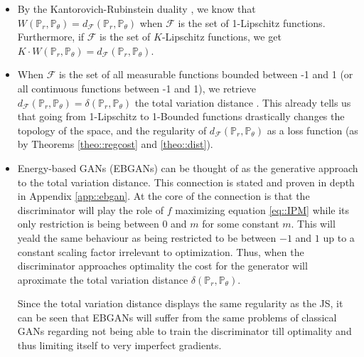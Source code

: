 \documentclass{article} %
\newcommand\PP{\mathbb{P}}
\theoremstyle{definition}
\theoremstyle{definition}
\newcommand\manF{\mathcal{F}}
\begin{document}
\begin{itemize}
\item By the Kantorovich-Rubinstein duality \cite{Vil},
we know that $W(\PP_r, \PP_\theta) = d_\manF(\PP_r,
\PP_\theta)$ when $\manF$ is the set of 1-Lipschitz
functions. Furthermore, if $\manF$ is the set
of $K$-Lipschitz functions, we get $K \cdot W(\PP_r,
\PP_\theta) = d_\manF(\PP_r, \PP_\theta)$.

\item When $\manF$ is the set of all measurable
functions bounded between -1 and 1 (or all
continuous functions between -1 and 1), we
retrieve $d_\manF(\PP_r, \PP_\theta) = \delta(\PP_r,
\PP_\theta)$ the total variation distance \cite{Muller-IPM}.
This already tells us that going from 1-Lipschitz
to 1-Bounded functions drastically changes the
topology of the space, and the regularity
of $d_\manF(\PP_r, \PP_\theta)$ as a loss
function (as by Theorems \autoref{theo::regcost}
and \autoref{theo::dist}).

\item Energy-based GANs (EBGANs) \cite{Zhao-ea-EBGAN}
can be thought of
as the generative approach to the total variation
distance. This connection is stated and
proven in depth in Appendix \autoref{app::ebgan}.
At the core of the connection is that the discriminator
will play the role of $f$ maximizing equation
\eqref{eq::IPM} while its only restriction is
being between $0$ and $m$ for
some constant $m$. This will yeald the same
behaviour as being restricted to be between $-1$
and $1$ up to a constant scaling factor irrelevant
to optimization. Thus, when the discriminator
approaches optimality the cost for the generator
will aproximate the total variation distance
$\delta(\PP_r, \PP_\theta)$.

Since the total variation distance displays the
same regularity as the JS, it can be seen that
EBGANs will suffer from the same problems
of classical GANs regarding not being able
to train the discriminator till optimality
and thus limiting itself to very imperfect
gradients.


\end{itemize}
\end{document}

